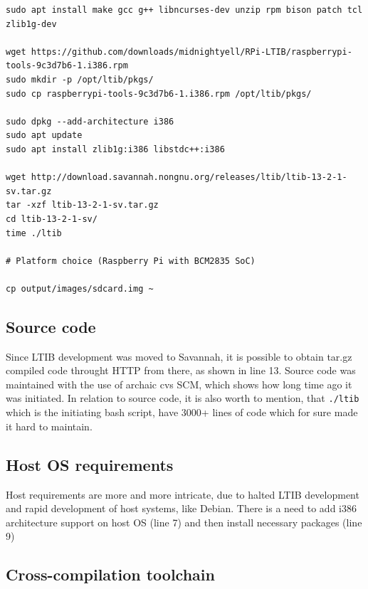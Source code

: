\documentclass[printmode]{mgr}
\begin{document}

\begin{lstlisting}
sudo apt install make gcc g++ libncurses-dev unzip rpm bison patch tcl zlib1g-dev

wget https://github.com/downloads/midnightyell/RPi-LTIB/raspberrypi-tools-9c3d7b6-1.i386.rpm
sudo mkdir -p /opt/ltib/pkgs/
sudo cp raspberrypi-tools-9c3d7b6-1.i386.rpm /opt/ltib/pkgs/

sudo dpkg --add-architecture i386
sudo apt update
sudo apt install zlib1g:i386 libstdc++:i386

wget http://download.savannah.nongnu.org/releases/ltib/ltib-13-2-1-sv.tar.gz
tar -xzf ltib-13-2-1-sv.tar.gz
cd ltib-13-2-1-sv/
time ./ltib

# Platform choice (Raspberry Pi with BCM2835 SoC)

cp output/images/sdcard.img ~
\end{lstlisting}




\subsection*{Source code}

Since LTIB development was moved to Savannah, it is possible to obtain tar.gz compiled code throught HTTP from there, as shown in line 13.
Source code was maintained with the use of archaic cvs SCM, which shows how long time ago it was initiated.
In relation to source code, it is also worth to mention, that \verb|./ltib| which is the initiating bash script, have 3000+ lines of code which for sure made it hard to maintain. 

\subsection*{Host OS requirements}

Host requirements are more and more intricate, due to halted LTIB development and rapid development of host systems, like Debian.
There is a need to add i386 architecture support on host OS (line 7) and then install necessary packages (line 9)

\subsection*{Cross-compilation toolchain}
\end{document}
